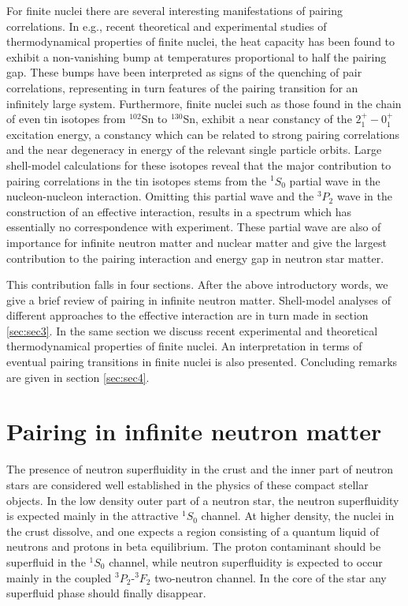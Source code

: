 For finite nuclei there are several interesting manifestations
of pairing correlations.
In e.g., recent theoretical and experimental studies 
of thermodynamical properties of finite nuclei, the heat capacity
has been found to exhibit a non-vanishing bump at temperatures proportional to
half the pairing gap. These bumps have been interpreted as  signs of the
quenching of pair correlations, representing in turn features
of the pairing transition for an infinitely large system.              
Furthermore,
finite nuclei such as those found in the chain of even tin isotopes 
from $^{102}$Sn to $^{130}$Sn,
exhibit a near constancy of the $2^+_1-0^+_1$ excitation energy, 
a constancy which can be related
to strong pairing correlations and the near degeneracy in 
energy of the relevant single particle
orbits. Large shell-model calculations for these isotopes 
reveal that the major contribution to
pairing correlations in the tin isotopes stems from the $^1S_0$ 
partial wave in the nucleon-nucleon
interaction. Omitting this partial wave and the $^3P_2$ wave 
in the construction of an effective
interaction, results in a spectrum which has 
essentially no correspondence with experiment.
These partial wave are also of importance for infinite 
neutron matter and nuclear matter and give
the largest contribution to the pairing interaction and 
energy gap in neutron star matter. 

This contribution falls in four sections. After the above introductory words, we give a 
brief review of pairing in infinite neutron matter. Shell-model
analyses of different approaches to the effective interaction are in turn made in section
\ref{sec:sec3}. In the same section we discuss 
recent experimental and theoretical 
thermodynamical properties of finite nuclei. An
interpretation in terms  of eventual pairing transitions 
in finite nuclei is also presented. Concluding remarks 
are given in section \ref{sec:sec4}.

\section{Pairing in infinite neutron matter}\label{sec:sec2}

The presence of neutron superfluidity in 
the crust and the inner part 
of neutron stars 
are considered well established 
in the physics of these compact stellar objects. 
In the low density outer part of a neutron star, 
the neutron superfluidity is expected 
mainly in the attractive $^1S_0$ channel. 
At higher density, the nuclei in the crust dissolve, and one 
expects a region consisting of a quantum liquid of neutrons and 
protons in beta equilibrium. 
The proton contaminant should be superfluid 
in the $^1S_0$ channel, while neutron superfluidity is expected to  
occur mainly in the coupled $^3P_2$-$^3F_2$ two-neutron channel. 
In the core of the star any superfluid 
phase should finally disappear.
 
